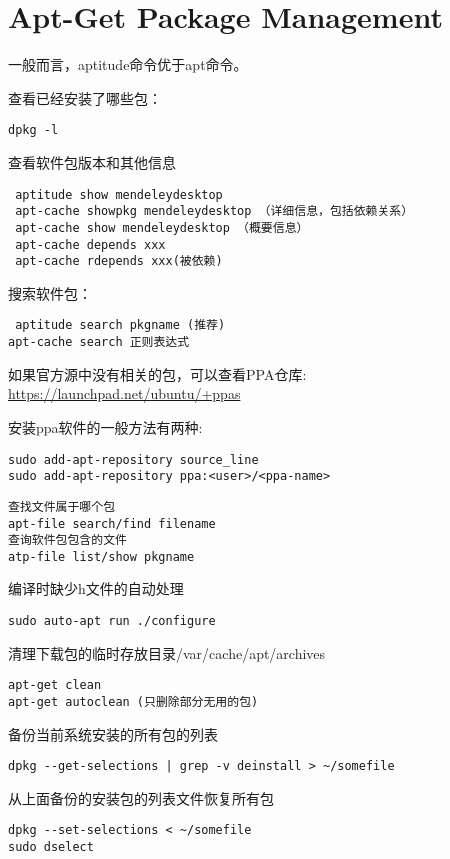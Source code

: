 \section{Apt-Get Package Management}

一般而言，aptitude命令优于apt命令。

查看已经安装了哪些包：
\begin{verbatim}
dpkg -l
\end{verbatim}

查看软件包版本和其他信息
\begin{verbatim}
 aptitude show mendeleydesktop
 apt-cache showpkg mendeleydesktop （详细信息，包括依赖关系）
 apt-cache show mendeleydesktop （概要信息）
 apt-cache depends xxx
 apt-cache rdepends xxx(被依赖)
\end{verbatim}

搜索软件包：
\begin{verbatim}
 aptitude search pkgname (推荐)
apt-cache search 正则表达式
\end{verbatim}

如果官方源中没有相关的包，可以查看PPA仓库:
\url{https://launchpad.net/ubuntu/+ppas}

安装ppa软件的一般方法有两种:
\begin{verbatim}
sudo add-apt-repository source_line
sudo add-apt-repository ppa:<user>/<ppa-name>
\end{verbatim}

\begin{verbatim}
查找文件属于哪个包
apt-file search/find filename
查询软件包包含的文件
atp-file list/show pkgname
\end{verbatim}

编译时缺少h文件的自动处理
\begin{verbatim}
sudo auto-apt run ./configure
\end{verbatim}

清理下载包的临时存放目录/var/cache/apt/archives
\begin{verbatim}
apt-get clean
apt-get autoclean (只删除部分无用的包)
\end{verbatim}

备份当前系统安装的所有包的列表
\begin{verbatim}
dpkg --get-selections | grep -v deinstall > ~/somefile
\end{verbatim}

从上面备份的安装包的列表文件恢复所有包
\begin{verbatim}
dpkg --set-selections < ~/somefile
sudo dselect
\end{verbatim}

